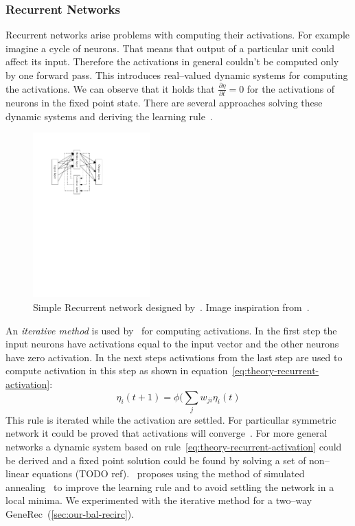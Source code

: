 \subsubsection{Recurrent Networks}
\label{sec:theory-recurrent} 

Recurrent networks arise problems with computing their activations. For example imagine a cycle of neurons. That means that output of a particular unit could affect its input. Therefore the activations in general couldn't be computed only by one forward pass. This introduces real--valued dynamic systems for computing the activations. We can observe that it holds that $\frac{\partial\eta}{\partial t} = 0$ for the activations of neurons in the fixed point state. There are several approaches solving these dynamic systems and deriving the learning rule~\cite{pineda1987generalization, pearlmutter1989learning, williams1989learning, elman1990finding, haykin1994neural}. 

\begin{figure}[H]
  \centering
  \includegraphics[width=0.4\textwidth]{img/models-recurrent.pdf}    
  \caption{Simple Recurrent network designed by~\citet{elman1990finding}. Image inspiration from~\citet{haykin1994neural}.} 
  \label{fig:theory-recurrent}
\end{figure}

An \emph{iterative method} is used by~\citet{movellan1990contrastive} for computing activations. In the first step the input neurons have activations equal to the input vector and the other neurons have zero activation. In the next steps activations from the last step are used to compute activation in this step as shown in equation~\ref{eq:theory-recurrent-activation}: 
\begin{equation}
  \label{eq:theory-recurrent-activation} 
  \eta_i(t+1) = \phi(\sum_j w_{ji}\eta_i(t)
\end{equation}
This rule is iterated while the activation are settled. For particullar symmetric network it could be proved that activations will converge~\citep{o1996bio}. For more general networks a dynamic system based on rule~\ref{eq:theory-recurrent-activation} could be derived and a fixed point solution could be found by solving a set of non--linear equations (TODO ref).~\citet{movellan1990contrastive} proposes using the method of simulated annealing~\citep{kirkpatrick1983optimization,vcerny1985thermodynamical} to improve the learning rule and to avoid settling the network in a local minima. We experimented with the iterative method for a two--way GeneRec~(\ref{sec:our-bal-recirc}). 

